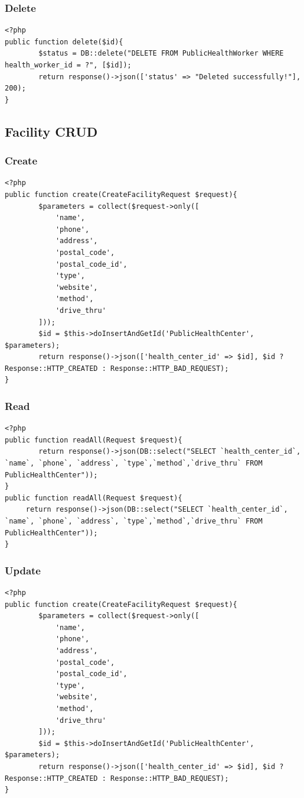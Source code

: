 \documentclass{article}
\begin{document}
\subsubsection{Delete}
\begin{verbatim}
<?php
public function delete($id){
        $status = DB::delete("DELETE FROM PublicHealthWorker WHERE health_worker_id = ?", [$id]);
        return response()->json(['status' => "Deleted successfully!"], 200);
}

\end{verbatim}
\subsection{Facility CRUD}
\subsubsection{Create}
\begin{verbatim}
<?php
public function create(CreateFacilityRequest $request){
        $parameters = collect($request->only([
            'name',
            'phone',
            'address',
            'postal_code',
            'postal_code_id',
            'type',
            'website',
            'method',
            'drive_thru'
        ]));
        $id = $this->doInsertAndGetId('PublicHealthCenter', $parameters);
        return response()->json(['health_center_id' => $id], $id ? Response::HTTP_CREATED : Response::HTTP_BAD_REQUEST);
}
\end{verbatim}
\subsubsection{Read}
\begin{verbatim}
<?php
public function readAll(Request $request){
        return response()->json(DB::select("SELECT `health_center_id`, `name`, `phone`, `address`, `type`,`method`,`drive_thru` FROM PublicHealthCenter"));
}
public function readAll(Request $request){
     return response()->json(DB::select("SELECT `health_center_id`, `name`, `phone`, `address`, `type`,`method`,`drive_thru` FROM PublicHealthCenter"));
}
\end{verbatim}
\subsubsection{Update}
\begin{verbatim}
<?php
public function create(CreateFacilityRequest $request){
        $parameters = collect($request->only([
            'name',
            'phone',
            'address',
            'postal_code',
            'postal_code_id',
            'type',
            'website',
            'method',
            'drive_thru'
        ]));
        $id = $this->doInsertAndGetId('PublicHealthCenter', $parameters);
        return response()->json(['health_center_id' => $id], $id ? Response::HTTP_CREATED : Response::HTTP_BAD_REQUEST);
}
\end{verbatim}
\end{document}
